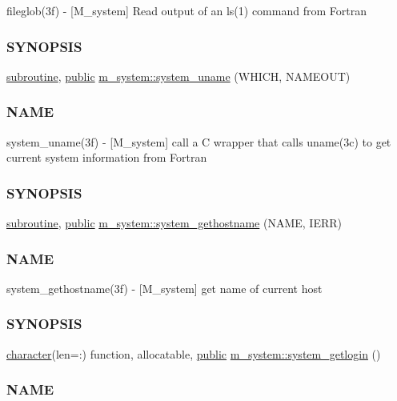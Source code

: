 \begin{DoxyCompactItemize}
\begin{DoxyCompactList}
fileglob(3f) -\/ \mbox{[}M\+\_\+system\mbox{]} Read output of an ls(1) command from Fortran \subsubsection*{S\+Y\+N\+O\+P\+S\+IS}\end{DoxyCompactList}\item 
\hyperlink{M__stopwatch_83_8txt_acfbcff50169d691ff02d4a123ed70482}{subroutine}, \hyperlink{M__stopwatch_83_8txt_a2f74811300c361e53b430611a7d1769f}{public} \hyperlink{namespacem__system_a04e5d49509c44bcb2ccabfd80ec8cdfb}{m\+\_\+system\+::system\+\_\+uname} (W\+H\+I\+CH, N\+A\+M\+E\+O\+UT)
\begin{DoxyCompactList}\small\item\em \subsubsection*{N\+A\+ME}

system\+\_\+uname(3f) -\/ \mbox{[}M\+\_\+system\mbox{]} call a C wrapper that calls uname(3c) to get current system information from Fortran \subsubsection*{S\+Y\+N\+O\+P\+S\+IS}\end{DoxyCompactList}\item 
\hyperlink{M__stopwatch_83_8txt_acfbcff50169d691ff02d4a123ed70482}{subroutine}, \hyperlink{M__stopwatch_83_8txt_a2f74811300c361e53b430611a7d1769f}{public} \hyperlink{namespacem__system_a96fab225737afb77ff1cbba9866f0d05}{m\+\_\+system\+::system\+\_\+gethostname} (N\+A\+ME, I\+E\+RR)
\begin{DoxyCompactList}\small\item\em \subsubsection*{N\+A\+ME}

system\+\_\+gethostname(3f) -\/ \mbox{[}M\+\_\+system\mbox{]} get name of current host \subsubsection*{S\+Y\+N\+O\+P\+S\+IS}\end{DoxyCompactList}\item 
\hyperlink{option__stopwatch_83_8txt_abd4b21fbbd175834027b5224bfe97e66}{character}(len=\+:) function, allocatable, \hyperlink{M__stopwatch_83_8txt_a2f74811300c361e53b430611a7d1769f}{public} \hyperlink{namespacem__system_a70f78645a1f130734005e190d469529d}{m\+\_\+system\+::system\+\_\+getlogin} ()
\begin{DoxyCompactList}\small\item\em \subsubsection*{N\+A\+ME}


\end{DoxyCompactList}
\end{DoxyCompactItemize}
